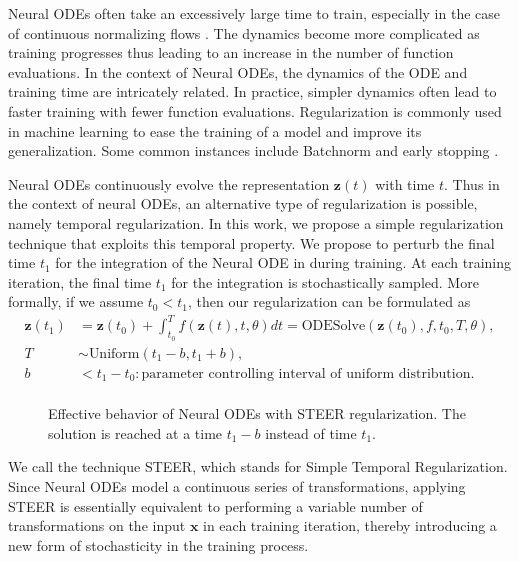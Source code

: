 Neural ODEs often take an excessively large time to train, especially in the case of continuous normalizing flows \cite{grathwohl2018ffjord} . The dynamics become more complicated as training progresses thus leading to an increase in the number of function evaluations. In the context of Neural ODEs, the dynamics of the ODE and training time are intricately related. In practice, simpler dynamics \cite{dupont2019augmented, finlay2020train} often lead to faster training with fewer function evaluations. Regularization is commonly used in machine learning to ease the training of a model and improve its generalization. Some common instances include Batchnorm \cite{ioffe2015batch} and early stopping \cite{yao2007early}. 




Neural ODEs continuously evolve the representation $\mathbf{z}(t)$ with time $t$. Thus in the context of neural ODEs, an alternative type of regularization is possible, namely temporal regularization. In this work, we propose a simple regularization technique that exploits this temporal property. We propose to perturb the final time $t_1$ for the integration of the Neural ODE in  during training. At each training iteration, the final time $t_1$ for the integration is stochastically sampled. More formally, if we assume $t_0<t_1$, then our regularization can be formulated as 
\begin{equation}
	\begin{split}
		\label{skip_formulation}
		\mathbf{z}(t_1) &= \mathbf{z}(t_0) + \int_{t_0}^{T} f(\mathbf{z}(t) , t , \theta) dt = \text{ODESolve}(\mathbf{z}(t_0) , f , t_0, T , \theta  ), \\
		T &\sim \text{Uniform} ( t_{1}-b, t_{1}+ b ),  \\
		b &< t_1-t_0 :  \text{parameter controlling interval of uniform distribution}. \\
	\end{split}
\end{equation}


\begin{figure}
	\centering  
	\caption{Effective behavior of Neural ODEs with STEER regularization. The solution is reached at a time $t_1-b$ instead of time $t_{1}$.}
	\label{fig:behavior}
\end{figure}

We call the technique STEER, which stands for Simple Temporal Regularization. 
Since Neural ODEs model a continuous series of transformations, applying STEER is essentially equivalent to performing a variable number of transformations on the input $\mathbf{x}$ in each training iteration, thereby introducing a new form of stochasticity in the training process.

